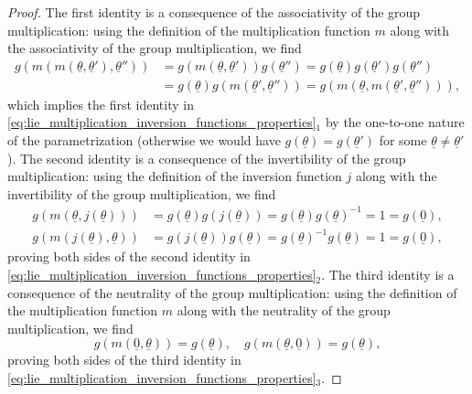 \begin{proof}
    The first identity is a consequence of the associativity of the group multiplication: using the definition of the multiplication function \(m\) along with the associativity of the group multiplication, we find
    \[
        \begin{aligned}
            g(m(m(\underline{\theta}, \underline{\theta}'), \underline{\theta}'')) & = g(m(\underline{\theta}, \underline{\theta}')) g(\underline{\theta}'') = g(\underline{\theta}) g(\underline{\theta}') g(\underline{\theta}'')    \\
                                                                                   & = g(\underline{\theta}) g(m(\underline{\theta}', \underline{\theta}'')) = g(m(\underline{\theta}, m(\underline{\theta}', \underline{\theta}''))),
        \end{aligned}
    \]
    which implies the first identity in \eqref{eq:lie_multiplication_inversion_functions_properties}\(_1\) by the one-to-one nature of the parametrization (otherwise we would have \(g(\underline{\theta}) = g(\underline{\theta}')\) for some \(\underline{\theta} \neq \underline{\theta}'\)). The second identity is a consequence of the invertibility of the group multiplication: using the definition of the inversion function \(j\) along with the invertibility of the group multiplication, we find
    \[
        \begin{aligned}
            g(m(\underline{\theta}, j(\underline{\theta}))) & = g(\underline{\theta}) g(j(\underline{\theta})) = g(\underline{\theta}) g(\underline{\theta})^{-1} = 1 = g(\underline{0}), \\
            g(m(j(\underline{\theta}), \underline{\theta})) & = g(j(\underline{\theta})) g(\underline{\theta}) = g(\underline{\theta})^{-1} g(\underline{\theta}) = 1 = g(\underline{0}),
        \end{aligned}
    \]
    proving both sides of the second identity in \eqref{eq:lie_multiplication_inversion_functions_properties}\(_2\). The third identity is a consequence of the neutrality of the group multiplication: using the definition of the multiplication function \(m\) along with the neutrality of the group multiplication, we find
    \[
        g(m(\underline{0}, \underline{\theta})) = g(\underline{\theta}), \quad g(m(\underline{\theta}, \underline{0})) = g(\underline{\theta}),
    \]
    proving both sides of the third identity in \eqref{eq:lie_multiplication_inversion_functions_properties}\(_3\).
\end{proof}

